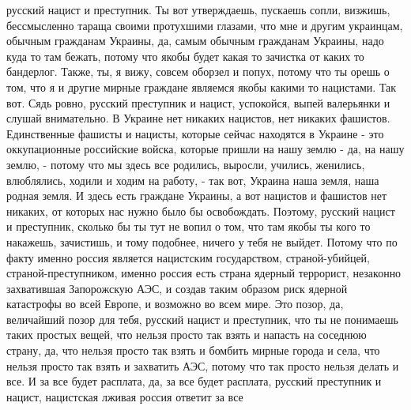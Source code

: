 русский нацист и преступник. Ты вот утверждаешь, пускаешь сопли, визжишь,
бессмысленно тараща своими протухшими глазами, что мне и другим украинцам,
обычным гражданам Украины, да, самым обычным гражданам Украины, надо куда то
там бежать, потому что якобы будет какая то зачистка от каких то бандерлог.
Также, ты, я вижу, совсем оборзел и попух, потому что ты орешь о том, что я и
другие мирные граждане являемся якобы какими то нацистами.  Так вот. Сядь
ровно, русский преступник и нацист, успокойся, выпей валерьянки и слушай
внимательно.  В Украине нет никаких нацистов, нет никаких фашистов.
Единственные фашисты и нацисты, которые сейчас находятся в Украине - это
оккупационные российские войска, которые пришли на нашу землю - да, на нашу
землю, - потому что мы здесь все родились, выросли, учились, женились,
влюблялись, ходили и ходим на работу, - так вот, Украина наша земля, наша
родная земля.  И здесь есть граждане Украины, а вот нацистов и фашистов нет
никаких, от которых нас нужно было бы освобождать.  Поэтому, русский нацист и
преступник, сколько бы ты тут не вопил о том, что там якобы ты кого то
накажешь, зачистишь, и тому подобнее, ничего у тебя не выйдет. Потому что по
факту именно россия является нацистским государством, страной-убийцей,
страной-преступником, именно россия есть страна ядерный террорист, незаконно
захватившая Запорожскую АЭС, и создав таким образом риск ядерной катастрофы во
всей Европе, и возможно во всем мире. Это позор, да, величайший позор для тебя,
русский нацист и преступник, что ты не понимаешь таких простых вещей, что
нельзя просто так взять и напасть на соседнюю страну, да, что нельзя просто так
взять и бомбить мирные города и села, что нельзя просто так взять и захватить
АЭС, потому что так просто нельзя делать и все. И за все будет расплата, да, за
все будет расплата, русский преступник и нацист, нацистская лживая россия
ответит за все
